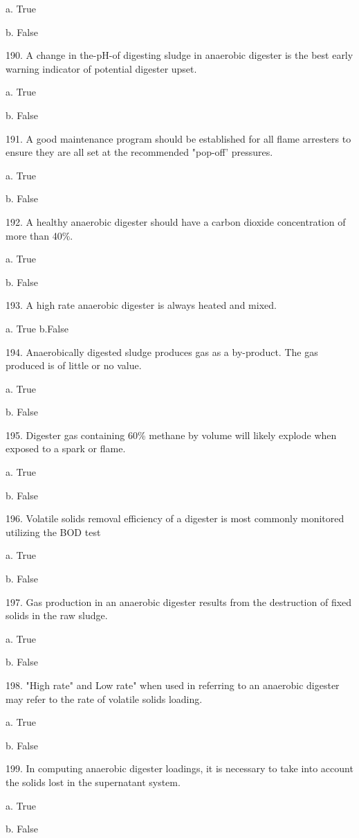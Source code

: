 \documentclass{article}
\begin{document}
a. True 

b. False 


190. A change in the-pH-of digesting sludge in anaerobic digester is the best early warning indicator of potential digester upset. 

a. True 

b. False 


191. A good maintenance program should be established for all flame arresters to ensure they are all set at the recommended "pop-off' pressures. 

a. True 

b. False 


192. A healthy anaerobic digester should have a carbon dioxide concentration of more than 40\%. 

a. True 

b. False 


193. A high rate anaerobic digester is always heated and mixed. 

a. True
b.False 


194. Anaerobically digested sludge produces gas as a by-product. The gas produced is of little or no value. 

a. True 

b. False 


195. Digester gas containing 60\% methane by volume will likely explode when exposed to a spark or flame. 

a. True 

b. False 


196. Volatile solids removal efficiency of a digester is most commonly monitored utilizing the BOD test

a. True 

b. False 


197. Gas production in an anaerobic digester results from the destruction of fixed solids in the raw sludge. 

a. True 

b. False 


198. "High rate" and Low rate" when used in referring to an anaerobic digester may refer to the rate of volatile solids loading. 

a. True 

b. False 


199. In computing anaerobic digester loadings, it is necessary to take into account the solids lost in the supernatant system. 

a. True 

b. False 
\end{document}
